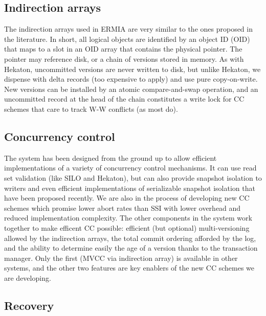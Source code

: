 \subsection{Indirection arrays}

The indirection arrays used in ERMIA are very similar to the ones proposed in the literature. In short, all logical objects are identified by an object ID (OID) that maps to a slot in an OID array that contains the physical pointer. The pointer may reference disk, or a chain of versions stored in memory. As with Hekaton, uncommitted versions are never written to disk, but unlike Hekaton, we dispense with delta records (too expensive to apply) and use pure copy-on-write. New versions can be installed by an atomic compare-and-swap operation, and an uncommitted record at the head of the chain constitutes a write lock for CC schemes that care to track W-W conflicts (as most do). 

\subsection{Concurrency control}

The system has been designed from the ground up to allow efficient implementations of a variety of concurrency control mechanisms. It can use read set validation (like SILO and Hekaton), but can also provide snapshot isolation to writers and even efficient implementations of serializable snapshot isolation that have been proposed recently\cite{Fekete}. We are also in the process of developing new CC schemes which promise lower abort rates than SSI with lower overhead and reduced implementation complexity. The other components in the system work together to make efficent CC possible: efficient (but optional) multi-versioning allowed by the indirection arrays, the total commit ordering afforded by the log, and the ability to determine easily the age of a version thanks to the transaction manager. Only the first (MVCC via indirection array) is available in other systems, and the other two features are key enablers of the new CC schemes we are developing.

\subsection{Recovery}

